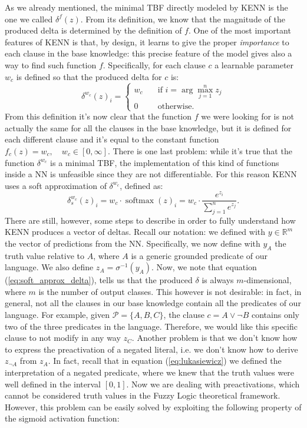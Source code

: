 As we already mentioned, the minimal TBF directly modeled by KENN is the one we called $\delta^f(z)$. From its definition, we know that the magnitude of the produced delta is determined by the definition of $f$. One of the most important features of KENN is that, by design, it learns to give the proper \textit{importance} to each clause in the base knowledge: this precise feature of the model gives also a way to find such function $f$. Specifically, for each clause $c$ a learnable parameter $w_c$ is defined so that the produced delta for $c$ is:
\begin{equation*}
\delta^{w_c}(z)_i = 
\begin{cases}
w_c \quad &\text{if } i = \arg\max_{j=1}^nz_j \\
0 \quad &\text{otherwise.}
\end{cases}
\end{equation*}
From this definition it's now clear that the function $f$ we were looking for is not actually the same for all the clauses in the base knowledge, but it is defined for each different clause and it's equal to the constant function $f_c(z) = w_c, \quad w_c \in \left[0, \infty\right]$. 
There is one last problem: while it's true that the function $\delta^{w_c}$ is a minimal TBF, the implementation of this kind of functions inside a NN is unfeasible since they are not differentiable. For this reason KENN uses a soft approximation of $\delta^{w_c}$, defined as:
\begin{equation}
\delta_s^{w_c}(z)_i = w_c \cdot \operatorname{softmax}(z)_i = w_c \cdot \frac{e^{z_i}}{\sum_{j=1}^ne^{z_j}}.
\label{eq:soft_approx_delta}
\end{equation}
There are still, however, some steps to describe in order to fully understand how KENN produces a vector of deltas. Recall our notation: we defined with $y \in \mathbb{R}^m$ the vector of predictions from the NN. Specifically, we now define with $y_A$ the truth value relative to $A$, where $A$ is a generic grounded predicate of our language. We also define $z_A=\sigma^{-1}(y_A)$. Now, we note that equation (\ref{eq:soft_approx_delta}), tells us that the produced $\delta$ is always $m$-dimensional, where $m$ is the number of output classes. This however is not desirable: in fact, in general, not all the clauses in our base knowledge contain all the predicates of our language. For example, given $\mathcal{P}=\{A,B,C\}$, the clause $c = A \vee \neg B$ contains only two of the three predicates in the language. Therefore, we would like this specific clause to not modify in any way $z_C$. Another problem is that we don't know how to express the preactivation of a negated literal, i.e. we don't know how to derive $z_{\neg A}$ from $z_A$. In fact, recall that in equation (\ref{eq:lukasiewicz}) we defined the interpretation of a negated predicate, where we knew that the truth values were well defined in the interval $\left[0,1\right]$. Now we are dealing with preactivations, which cannot be considered truth values in the Fuzzy Logic theoretical framework. However, this problem can be easily solved by exploiting the following property of the sigmoid activation function:
